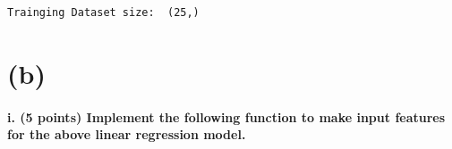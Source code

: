 \documentclass[a4paper,11pt]{article}%
\begin{document}
    \begin{Verbatim}[commandchars=\\\{\}]
Trainging Dataset size:  (25,)
    \end{Verbatim}
\pagebreak
    \hypertarget{b}{%
\section{(b)}\label{b}}

\hypertarget{i.-5-points-implement-the-following-function-to-make-input-features-for-the-above-linear-regression-model.}{%
\paragraph{i. (5 points) Implement the following function to make input
features for the above linear regression
model.}\label{i.-5-points-implement-the-following-function-to-make-input-features-for-the-above-linear-regression-model.}}
\end{document}

